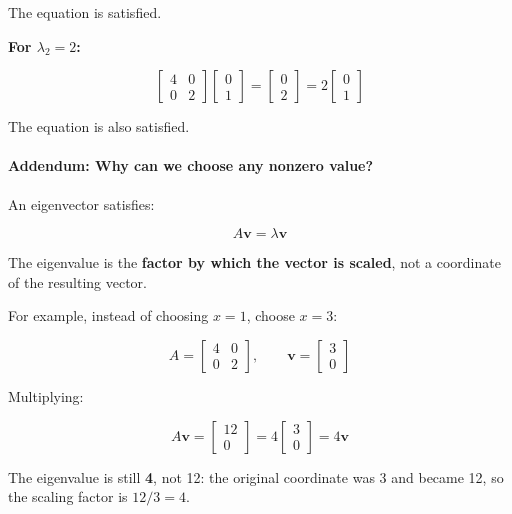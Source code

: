 \documentclass[11pt]{article}
\begin{document}
The equation is satisfied.

\textbf{For \(\lambda_2 = 2\):}

\[
\begin{bmatrix}
4 & 0 \\
0 & 2
\end{bmatrix}
\begin{bmatrix}
0 \\
1
\end{bmatrix}
=
\begin{bmatrix}
0 \\
2
\end{bmatrix}
=
2
\begin{bmatrix}
0 \\
1
\end{bmatrix}
\]

The equation is also satisfied.

\paragraph{Addendum: Why can we choose any nonzero
value?}\label{addendum-why-can-we-choose-any-nonzero-value}

An eigenvector satisfies:

\[
A\mathbf{v} = \lambda\mathbf{v}
\]

The eigenvalue is the \textbf{factor by which the vector is scaled}, not
a coordinate of the resulting vector.

For example, instead of choosing \(x = 1\), choose \(x = 3\):

\[
A =
\begin{bmatrix}
4 & 0 \\
0 & 2
\end{bmatrix},
\qquad
\mathbf{v} =
\begin{bmatrix}
3 \\
0
\end{bmatrix}
\]

Multiplying:

\[
A\mathbf{v}
=
\begin{bmatrix}
12 \\
0
\end{bmatrix}
=
4
\begin{bmatrix}
3 \\
0
\end{bmatrix}
=
4\mathbf{v}
\]

The eigenvalue is still \textbf{4}, not 12: the original coordinate was
3 and became 12, so the scaling factor is \(12/3 = 4\).
\end{document}
